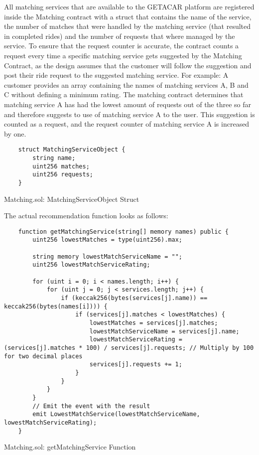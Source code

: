 All matching services that are available to the GETACAR platform are registered inside the Matching contract with a struct that contains the name of the service, the number of matches that were handled by the matching service (that resulted in completed rides) and the number of requests that where managed by the service. To ensure that the request counter is accurate, the contract counts a request every time a specific matching service gets suggested by the Matching Contract, as the design assumes that the customer will follow the suggestion and post their ride request to the suggested matching service. For example: A customer provides an array containing the names of matching services A, B and C without defining a minimum rating. The matching contract determines that matching service A has had the lowest amount of requests out of the three so far and therefore suggests to use of matching service A to the user. This suggestion is counted as a request, and the request counter of matching service A is increased by one.

\lstset{
  basicstyle=\footnotesize\ttfamily,
  breaklines=true,
  numbers=left,
  firstnumber=6
}

\begin{Listing}
\begin{lstlisting}
    struct MatchingServiceObject {
        string name;
        uint256 matches;
        uint256 requests;
    }
\end{lstlisting}
  \caption{Matching.sol: MatchingServiceObject Struct}
  \label{lst:MatchingServiceObject}
\end{Listing}


The actual recommendation function looks as follows: 

\lstset{
  basicstyle=\footnotesize\ttfamily,
  breaklines=true,
  numbers=left,
  firstnumber=59
}

\begin{Listing}
\begin{lstlisting}
    function getMatchingService(string[] memory names) public {
        uint256 lowestMatches = type(uint256).max;

        string memory lowestMatchServiceName = "";
        uint256 lowestMatchServiceRating;

        for (uint i = 0; i < names.length; i++) {
            for (uint j = 0; j < services.length; j++) {
                if (keccak256(bytes(services[j].name)) == keccak256(bytes(names[i]))) {
                    if (services[j].matches < lowestMatches) {
                        lowestMatches = services[j].matches;
                        lowestMatchServiceName = services[j].name;
                        lowestMatchServiceRating = (services[j].matches * 100) / services[j].requests; // Multiply by 100 for two decimal places
                        services[j].requests += 1;
                    }
                }
            }
        }
        // Emit the event with the result
        emit LowestMatchService(lowestMatchServiceName, lowestMatchServiceRating);
    }
\end{lstlisting}
  \caption{Matching.sol: getMatchingService Function}
  \label{lst:getMatchingService}
\end{Listing}

